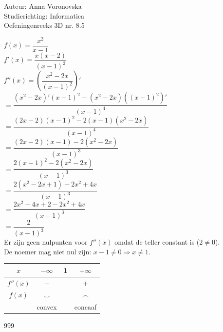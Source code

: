 \documentclass[a4paper]{article}
\begin{document}
  
\noindent \large Auteur: Anna Voronovska \\
\noindent \large Studierichting: Informatica\\
\noindent \large Oefeningenreeks 3D nr. 8.5\\

\medskip

\normalsize

$f(x) = \dfrac{x^2}{x-1}$\\

$f'(x) = \dfrac{x(x-2)}{(x-1)^2}$\\

$f''(x) = \left( \dfrac{x^2-2x}{(x-1)^2} \right)' $\\

$= \dfrac{(x^2-2x)'(x-1)^2 - (x^2-2x)((x-1)^2)'}{(x-1)^4} $\\

$= \dfrac{(2x-2)(x-1)^2 - 2(x-1)(x^2-2x)}{(x-1)^4} $\\

$= \dfrac{(2x-2)(x-1) - 2(x^2-2x)}{(x-1)^3} $\\

$= \dfrac{2(x-1)^2 - 2(x^2-2x)}{(x-1)^3} $\\

$= \dfrac{2(x^2-2x+1) - 2x^2+4x}{(x-1)^3} $\\

$= \dfrac{2x^2-4x+2 - 2x^2+4x}{(x-1)^3} $\\

$= \dfrac{2}{(x-1)^3}$\\

Er zijn geen nulpunten voor $f''(x)$ omdat de teller constant is ($2 \neq 0$). \\

De noemer mag niet nul zijn: $x-1 \neq 0 \Rightarrow x \neq 1$.\\

\begin{center}
\begin{tabular}{c|ccc}
$x$      & $-\infty$ & 1    & $+\infty$ \\ \hline
$f''(x)$ & $-$       &      & $+$ \\ \hline
$f(x)$   & $\smile$  &      & $\frown$ \\
         & convex    &      & concaaf
\end{tabular}
\end{center}




\begin{thebibliography}{999}
\end{thebibliography}
\end{document}
